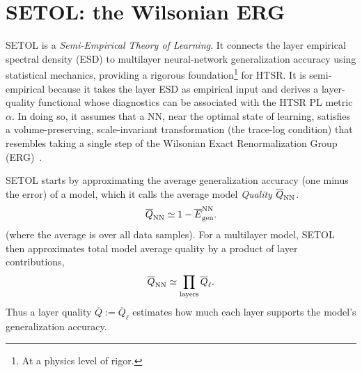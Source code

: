 \documentclass[10pt,twocolumn]{article}
\newcommand{\takeaway}[1]{%
  \par\vspace{4pt}\noindent\textcolor{boxblue}{#1}%
}
\begin{document}
\section{SETOL: the Wilsonian ERG }
\label{sxn:setol}
\enlargethispage{1.5\baselineskip}


SETOL is a \emph{Semi-Empirical Theory of Learning}.
It connects the layer empirical spectral density (ESD) to multilayer neural-network generalization accuracy using statistical mechanics,
providing a rigorous foundation\footnote{At a physics level of rigor.} for HTSR.
It is semi-empirical because it takes the layer ESD as empirical input and derives a layer-quality functional
whose diagnostics can be associated with the HTSR PL metric $\alpha$.
In doing so, it assumes that a NN, near the optimal state of learning, satisfies a volume-preserving, scale-invariant transformation
(the trace-log condition) that resembles taking a single step of the Wilsonian Exact Renormalization Group (ERG)~\cite{WilsonKogut1974,Polchinski1984}.


SETOL starts by approximating the average generalization accuracy (one minus the error) of a model,
which it calls the average model \emph{Quality} $\overline Q_{\rm NN}$. 
\begin{equation}
\overline Q_{\rm NN}\simeq 1-\overline E_{\rm gen}^{\rm NN}.
\label{eq:setol_quality}
\end{equation}
(where the average is over all data samples).
For a multilayer model, SETOL then approximates total model average quality by a product of layer contributions,
\begin{equation}
\overline Q_{\rm NN}\simeq\prod_{\rm layers}\overline Q_\ell .
\label{eq:setol_layer_product}
\end{equation}
Thus a layer quality $\overline Q:=\overline Q_\ell$ estimates how much each layer supports the model's generalization accuracy.
\end{document}
